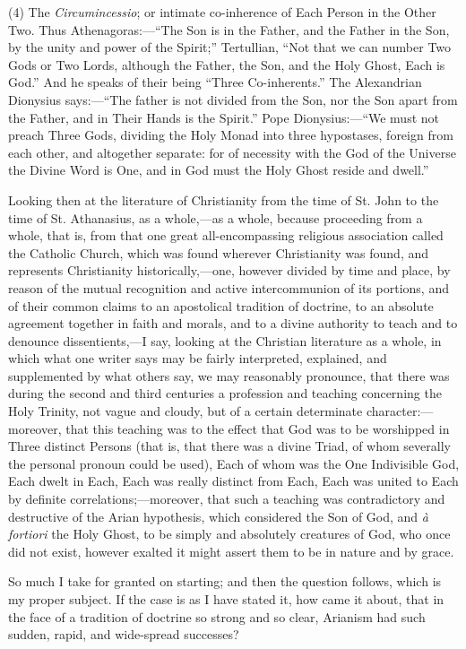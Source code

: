 (4) The \emph{Circumincessio}; or intimate co-inherence of Each
Person in the Other Two. Thus Athenagoras:—``The Son is in the
Father, and the Father in the Son, by the unity and power of the
Spirit;'' Tertullian, ``Not that we can number Two Gods or Two
Lords, although the Father, the Son, and the Holy Ghost, Each is
God.'' And he speaks of their being ``Three Co-inherents.''
The Alexandrian Dionysius says:—``The father is not divided from
the Son, nor the Son apart from the Father, and in Their Hands is the
Spirit.'' Pope Dionysius:—``We must not preach Three Gods,
dividing the Holy Monad into three hypostases, foreign from each
other, and altogether separate: for of necessity with the God of the
Universe the Divine Word is One, and in God must the Holy Ghost reside
and dwell.''

Looking then at the literature of Christianity from the time of St.
John to the time of St. Athanasius, as a whole,—as a whole, because
proceeding from a whole, that is, from that one great all-encompassing
religious association called the Catholic Church, which was found
wherever Christianity was found, and represents Christianity
historically,—one, however divided by time and place, by reason of
the mutual recognition and active intercommunion of its portions, and
of their common claims to an apostolical tradition of doctrine, to an
absolute agreement together in faith and morals, and to a divine
authority to teach and to denounce dissentients,—I say, looking at
the Christian literature as a whole, in which what one writer says may
be fairly interpreted, explained, and supplemented by what others say,
we may reasonably pronounce, that there was during the second and
third centuries a profession and teaching concerning the Holy Trinity,
not vague and cloudy, but of a certain determinate character:—moreover,
that this teaching was to the effect that God was to be worshipped in
Three distinct Persons (that is, that there was a divine Triad, of
whom severally the personal pronoun could be used), Each of whom was
the One Indivisible God, Each dwelt in Each, Each was really distinct
from Each, Each was united to Each by definite correlations;—moreover,
that such a teaching was contradictory and destructive of the Arian
hypothesis, which considered the Son of God, and \emph{à fortiori}
the Holy Ghost, to be simply and absolutely creatures of God, who once
did not exist, however exalted it might assert them to be in nature
and by grace.

So much I take for granted on starting; and then the question
follows, which is my proper subject. If the case is as I have stated
it, how came it about, that in the face of a tradition of doctrine so
strong and so clear, Arianism had such sudden, rapid, and wide-spread
successes?

